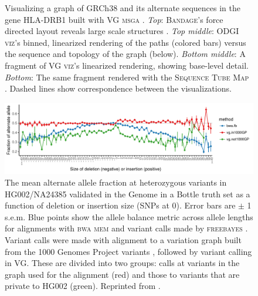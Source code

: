 \begin{figure}[p]
\begin{minipage}[c]{0.3\textwidth}
{      Visualizing a graph of GRCh38 and its alternate sequences in the gene HLA-DRB1 built with \textsc{VG msga} \cite{Garrison_2019}.
      \emph{Top}: \textsc{Bandage}'s force directed layout reveals large scale structures \cite{Wick_2015}.
      \emph{Top middle}: \textsc{ODGI viz}'s binned, linearized rendering of the paths (colored bars) versus the sequence and topology of the graph (below).
      \emph{Bottom middle}: A fragment of \textsc{VG viz}'s linearized rendering, showing base-level detail.
      \emph{Bottom}: The same fragment rendered with the \textsc{Sequence Tube Map} \cite{Beyer_2019}.
      Dashed lines show correspondence between the visualizations.
    } \label{fig:visualization}
  \end{minipage}
\end{figure}

\begin{figure}[p]
\centering
\includegraphics[width=1.0\textwidth]{figures/HG002_wg_pan_ref_bwa_true_hets_allele_balance_tsv_gz_3.pdf}
\caption[Indel allele balance in HG002]{The mean alternate allele fraction at heterozygous variants in HG002/NA24385 validated in the Genome in a Bottle truth set \cite{zook2014integrating} as a function of deletion or insertion size (SNPs at 0).
  Error bars are $\pm$ 1 s.e.m.
  Blue points show the allele balance metric across allele lengths for alignments with \textsc{bwa mem} \cite{Li_2013} and variant calls made by \textsc{freebayes} \cite{garrison2012haplotype}.
  Variant calls were made with alignment to a variation graph built from the 1000 Genomes Project variants \cite{1000_2015}, followed by variant calling in \textsc{VG}.
  These are divided into two groups: calls at variants in the graph used for the alignment (red) and those to variants that are private to HG002 (green).
  Reprinted from \cite{Garrison_2018}.}
\label{fig:allelebalance}
\end{figure}

